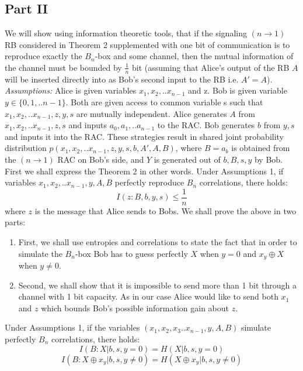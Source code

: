 \subsection*{Part II}
We will show using information theoretic tools, that if the signaling $(n\rightarrow 1)$ RB considered in Theorem 2 supplemented with one bit of communication is to reproduce exactly the $B_n$-box and some channel, then the mutual information of the channel must be bounded by $\frac{1}{n}$ bit (assuming that Alice's output of the RB $A$ will be inserted directly into as Bob's second input to the RB i.e. $A'=A$). \\
\textit{Assumptions:} Alice is given variables $x_1,x_2,..x_{n-1}$ and z. Bob is given variable $y\in \{0,1,..n-1\}$. Both are given access to common variable s such that $x_1,x_2,..x_{n-1},z,y,s$ are mutually independent. Alice generates $A$ from $x_1,x_2,..x_{n-1},z,s$ and inputs $a_0,a_1,..a_{n-1}$ to the RAC. Bob generates $b$ from $y,s$ and inputs it into the RAC. These strategies result in shared joint probability distribution $p(x_1,x_2,..x_{n-1},z,y,s,b,A',A,B)$, where $B=a_b$ is obtained from the $(n\rightarrow 1)$ RAC on Bob's side, and $Y$ is generated out of $b,B,s,y$ by Bob. 
First we shall express the Theorem 2 in other words. Under Assumptions 1, if variables $x_1,x_2,..x_{n-1},y,A,B$ perfectly reproduce $B_n$ correlations, there holds:
\begin{equation}
I(z:B,b,y,s)\leq \frac{1}{n}
\end{equation}
where $z$ is the message that Alice sends to Bobs.
We shall prove the above in two parts:
\begin{enumerate}
\item First, we shall use entropies and correlations to state the fact that in order to simulate the $B_n$-box Bob has to guess perfectly $X$ when $y=0$ and $x_y\oplus X$ when $y\neq 0$. 
\item Second, we shall show that it is impossible to send more than 1 bit through a channel with 1 bit capacity. As in our case Alice would like to send both $x_1$ and $z$ which bounds Bob's possible information gain about $z$. 
\end{enumerate}
\begin{mydef2}
Under Assumptions 1, if the variables $(x_1,x_2,x_3..x_{n-1},y,A,B)$ simulate perfectly $B_n$ correlations, there holds:
\begin{equation}
I(B:X|b,s,y= 0)=H(X|b,s,y=0)
\end{equation}
\begin{equation}
I(B:X\oplus x_y|b,s,y\neq 0)=H(X\oplus x_y|b,s,y\neq0)
\end{equation}
\end{mydef2}
